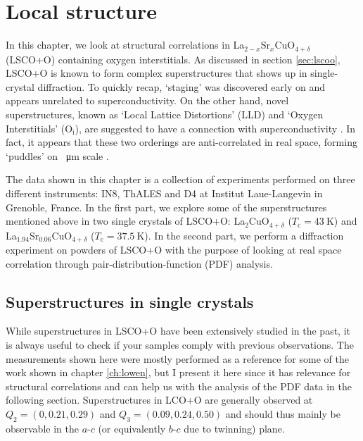 \chapter{Local structure}\label{ch:local}
In this chapter, we look at structural correlations in La$_{2-x}$Sr$_x$CuO$_{4+\delta}$ (LSCO+O) containing oxygen interstitials. As discussed in section \ref{sec:lscoo}, LSCO+O is known to form complex superstructures that shows up in single-crystal diffraction. To quickly recap, `staging' \cite{Wells1997,Ray2017} was discovered early on and appears unrelated to superconductivity. On the other hand, novel superstructures, known as `Local Lattice Distortions' (LLD) and `Oxygen Interstitials' (O$_\text{i}$), are suggested to have a connection with superconductivity \cite{Poccia2011}. In fact, it appears that these two orderings are anti-correlated in real space, forming `puddles' on \SI{}{\micro\meter} scale \cite{Poccia2012}.

The data shown in this chapter is a collection of experiments performed on three different instruments: IN8, ThALES and D4 at Institut Laue-Langevin in Grenoble, France. In the first part, we explore some of the superstructures mentioned above in two single crystals of LSCO+O: La$_2$CuO$_{4+\delta}$ ($T_\text{c} = \SI{43}{\kelvin}$) and La$_{1.94}$Sr$_{0.06}$CuO$_{4+\delta}$ ($T_\text{c} = \SI{37.5}{\kelvin}$). In the second part, we perform a diffraction experiment on powders of LSCO+O with the purpose of looking at real space correlation through pair-distribution-function (PDF) analysis.

\section{Superstructures in single crystals}\label{sec:single_crystal_superstructures}
While superstructures in LSCO+O have been extensively studied in the past, it is always useful to check if your samples comply with previous observations. The measurements shown here were mostly performed as a reference for some of the work shown in chapter \ref{ch:lowen}, but I present it here since it has relevance for structural correlations and can help us with the analysis of the PDF data in the following section. Superstructures in LCO+O are generally observed at $Q_2 = (0, 0.21, 0.29)$ and $Q_3 = (0.09, 0.24, 0.50)$ \cite{Kusmartsev2000} and should thus mainly be observable in the $a$-$c$ (or equivalently $b$-$c$ due to twinning) plane.


